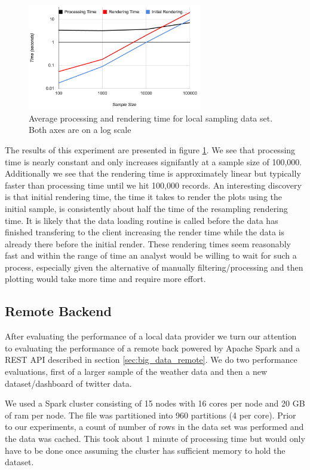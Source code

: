\documentclass[letter,twocolumn]{article}
\begin{document}
\begin{figure}
\begin{center}
\includegraphics[width=3in]{figs/weather_perf.png}
\end{center}
\caption{Average processing and rendering time for local sampling data set.  Both axes are on a log scale}\label{fig:weather_perf}
\end{figure}

The results of this experiment are presented in figure \ref{fig:weather_perf}.
We see that processing time is nearly constant and only increases signifantly at a sample size of 100,000.
Additionally we see that the rendering time is approximately linear but typically faster than processing time until we hit 100,000 records.
An interesting discovery is that initial rendering time, the time it takes to render the plots using the initial sample, is consistently about half the time of the resampling rendering time.
It is likely that the data loading routine is called before the data has finished transfering to the client increasing the render time while the data is already there before the initial render.
These rendering times seem reasonably fast and within the range of time an analyst would be willing to wait for such a process, especially given the alternative of manually filtering/processing and then plotting would take more time and require more effort.

\subsection{Remote Backend}

After evaluating the performance of a local data provider we turn our attention to evaluating the performance of a remote back powered by Apache Spark and a REST API described in section \ref{sec:big_data_remote}.  
We do two performance evaluations, first of a larger sample of the weather data and then a new dataset/dashboard of twitter data.

We used a Spark cluster consisting of 15 nodes with 16 cores per node and 20 GB of ram per node.
The file was partitioned into 960 partitions (4 per core).
Prior to our experiments, a count of number of rows in the data set was performed and the data was cached.
This took about 1 minute of processing time but would only have to be done once assuming the cluster has sufficient memory to hold the dataset.
\end{document}
